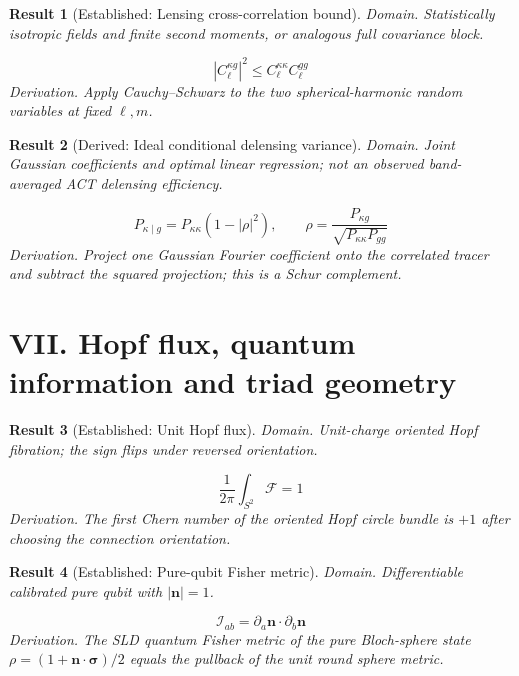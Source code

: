 \documentclass[aps,prd,onecolumn,notitlepage,groupedaddress,11pt]{revtex4-2}
\newtheorem{result}{Result}
\begin{document}
\begin{result}[\textsf{Established}: Lensing cross-correlation bound]\label{res:35}
\textit{Domain.} Statistically isotropic fields and finite second moments, or analogous full covariance block.\par
\begin{equation}\label{eq:35}
|C_\ell^{\kappa g}|^2\le C_\ell^{\kappa\kappa}C_\ell^{gg}
\end{equation}
\textit{Derivation.} Apply Cauchy--Schwarz to the two spherical-harmonic random variables at fixed $\ell,m$.
\end{result}

\begin{result}[\textsf{Derived}: Ideal conditional delensing variance]\label{res:36}
\textit{Domain.} Joint Gaussian coefficients and optimal linear regression; not an observed band-averaged ACT delensing efficiency.\par
\begin{equation}\label{eq:36}
P_{\kappa\mid g}=P_{\kappa\kappa}(1-|\rho|^2),\qquad\rho=\frac{P_{\kappa g}}{\sqrt{P_{\kappa\kappa}P_{gg}}}
\end{equation}
\textit{Derivation.} Project one Gaussian Fourier coefficient onto the correlated tracer and subtract the squared projection; this is a Schur complement.
\end{result}

\section{VII. Hopf flux, quantum information and triad geometry}

\begin{result}[\textsf{Established}: Unit Hopf flux]\label{res:37}
\textit{Domain.} Unit-charge oriented Hopf fibration; the sign flips under reversed orientation.\par
\begin{equation}\label{eq:37}
\frac1{2\pi}\int_{S^2}\mathcal F=1
\end{equation}
\textit{Derivation.} The first Chern number of the oriented Hopf circle bundle is $+1$ after choosing the connection orientation.
\end{result}

\begin{result}[\textsf{Established}: Pure-qubit Fisher metric]\label{res:38}
\textit{Domain.} Differentiable calibrated pure qubit with $|\boldsymbol n|=1$.\par
\begin{equation}\label{eq:38}
\mathcal I_{ab}=\partial_a\boldsymbol n\cdot\partial_b\boldsymbol n
\end{equation}
\textit{Derivation.} The SLD quantum Fisher metric of the pure Bloch-sphere state $\rho=(1+\boldsymbol n\cdot\boldsymbol\sigma)/2$ equals the pullback of the unit round sphere metric.
\end{result}
\end{document}
